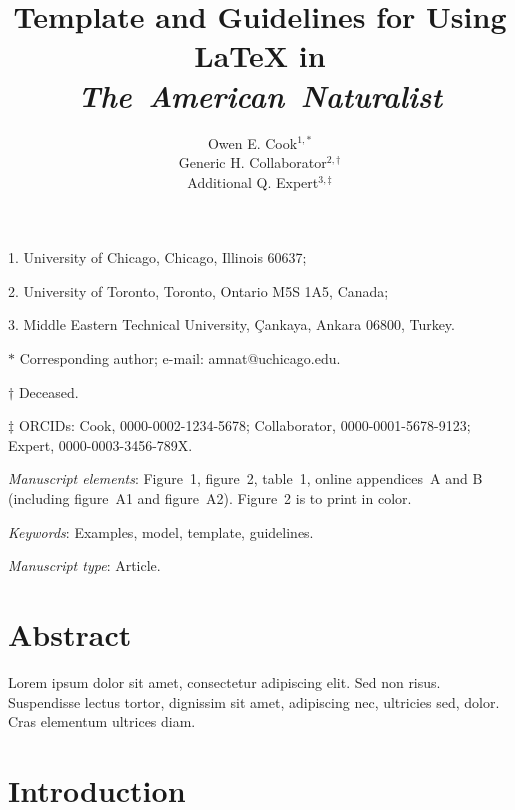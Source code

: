 \documentclass[11pt]{article}
\title{Template and Guidelines for Using \LaTeX{} 
in \textit{The~American~Naturalist}}
\author{Owen E. Cook$^{1,\ast}$ \\ 
Generic H. Collaborator$^{2,\dag}$ \\ 
Additional Q. Expert$^{3,\ddag}$}
\date{}
\begin{document}
\maketitle

\noindent{}1. University of Chicago, Chicago, Illinois 60637;

\noindent{}2. University of Toronto, Toronto, Ontario M5S 1A5, Canada;

\noindent{}3. Middle Eastern Technical University, \c{C}ankaya, 
Ankara 06800, Turkey.

\noindent{}$\ast$ Corresponding author; e-mail: amnat@uchicago.edu.

\noindent{}$\dag$ Deceased.

\noindent{}$\ddag$ ORCIDs: Cook, 0000-0002-1234-5678; Collaborator, 0000-0001-5678-9123; Expert, 0000-0003-3456-789X.

\bigskip

\textit{Manuscript elements}: Figure~1, figure~2, table~1, online
appendices~A and B (including figure~A1 and figure~A2). Figure~2 is to
print in color.

\bigskip

\textit{Keywords}: Examples, model, template, guidelines.

\bigskip

\textit{Manuscript type}: Article. 

\bigskip


\linenumbers{}
\modulolinenumbers[3]

\newpage{}

\section*{Abstract}

Lorem ipsum dolor sit amet, consectetur adipiscing elit. Sed non risus. 
Suspendisse lectus tortor, dignissim sit amet, adipiscing nec, ultricies 
sed, dolor. Cras elementum ultrices diam. 

\newpage{}

\section*{Introduction}

\end{document}
